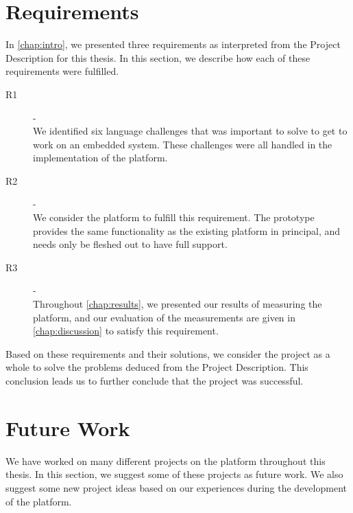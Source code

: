 \section{Requirements}

In \autoref{chap:intro}, we presented three requirements as interpreted from the Project Description for this thesis.
In this section, we describe how each of these requirements were fulfilled.

\begin{description}
    \item[R1] - {{\reqi}} \hfill \\
    We identified six language challenges that was important to solve to get {\rust} to work on an embedded system.
    These challenges were all handled in the implementation of the {\rg} platform.

  \item[R2] - {{\reqii}} \hfill \\
    We consider the {\rg} platform to fulfill this requirement.
    The prototype provides the same functionality as the existing {\C} platform in principal, and needs only be fleshed out to have full support.

    \item[R3] - {{\reqiii}} \hfill \\
    Throughout \autoref{chap:results}, we presented our results of measuring the {\rg} platform, and our evaluation of the measurements are given in \autoref{chap:discussion} to satisfy this requirement.
\end{description}

Based on these requirements and their solutions, we consider the project as a whole to solve the problems deduced from the Project Description.
This conclusion leads us to further conclude that the project was successful.

\section{Future Work}
\label{chap:future}

We have worked on many different projects on the {\rg} platform throughout this thesis.
In this section, we suggest some of these projects as future work.
We also suggest some new project ideas based on our experiences during the development of the {\rg} platform.

